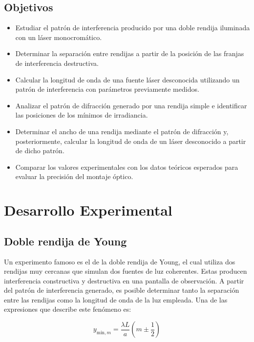 \documentclass[article,12pt]{elsarticle}
\begin{document}
\subsection{Objetivos}
\begin{itemize}
    \item Estudiar el patrón de interferencia producido por una doble rendija iluminada con un láser monocromático.
    \item Determinar la separación entre rendijas a partir de la posición de las franjas de interferencia destructiva.
    \item Calcular la longitud de onda de una fuente láser desconocida utilizando un patrón de interferencia con parámetros previamente medidos.
    \item Analizar el patrón de difracción generado por una rendija simple e identificar las posiciones de los mínimos de irradiancia.
    \item Determinar el ancho de una rendija mediante el patrón de difracción y, posteriormente, calcular la longitud de onda de un láser desconocido a partir de dicho patrón.
    \item Comparar los valores experimentales con los datos teóricos esperados para evaluar la precisión del montaje óptico.
\end{itemize}

\section{Desarrollo Experimental}



\subsection*{Doble rendija de Young}

Un experimento famoso es el de la doble rendija de Young, el cual utiliza dos rendijas muy cercanas que simulan dos fuentes de luz coherentes. Estas producen interferencia constructiva y destructiva en una pantalla de observación. A partir del patrón de interferencia generado, es posible determinar tanto la separación entre las rendijas como la longitud de onda de la luz empleada. Una de las expresiones que describe este fenómeno es:

\begin{equation}
y_{\text{min}, m} = \frac{\lambda L}{a} \left( m \pm \frac{1}{2} \right)
\end{equation}
\end{document}
